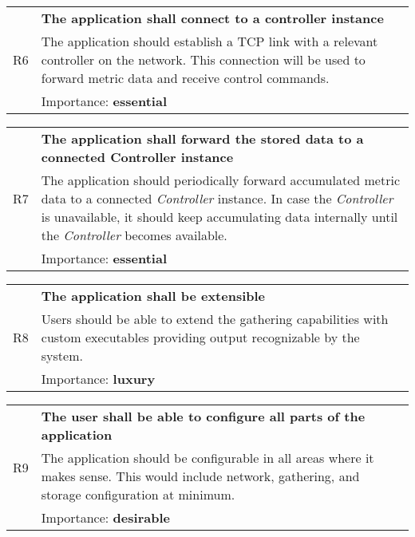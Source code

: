             \vspace{0.5cm}
            \noindent
            \begin{tabular}{ p{0.7cm}|p{14.5cm} }
                \multirow{3}{*}{R6 } & \textbf{The application shall connect to a controller instance}\\
                \cline{2-2}
                & The application should establish a TCP link with a relevant controller on the network. This connection will be used to forward metric data and receive control commands.\\
                \cline{2-2}
                & Importance: \textbf{essential}
            \end{tabular}

            \vspace{0.5cm}
            \noindent
            \begin{tabular}{ p{0.7cm}|p{14.5cm} }
                \multirow{3}{*}{R7 } & \textbf{The application shall forward the stored data to a connected Controller instance}\\
                \cline{2-2}
                & The application should periodically forward accumulated metric data to a connected \textit{Controller} instance. In case the \textit{Controller} is unavailable, it should keep accumulating data internally until the \textit{Controller} becomes available.\\
                \cline{2-2}
                & Importance: \textbf{essential}
            \end{tabular}

            \vspace{0.5cm}
            \noindent
            \begin{tabular}{ p{0.7cm}|p{14.5cm} }
                \multirow{3}{*}{R8 } & \textbf{The application shall be extensible}\\
                \cline{2-2}
                & Users should be able to extend the gathering capabilities with custom executables providing output recognizable by the system.\\
                \cline{2-2}
                & Importance: \textbf{luxury}
            \end{tabular}

            \vspace{0.5cm}
            \noindent
            \begin{tabular}{ p{0.7cm}|p{14.5cm} }
                \multirow{3}{*}{R9 } & \textbf{The user shall be able to configure all parts of the application}\\
                \cline{2-2}
                & The application should be configurable in all areas where it makes sense. This would include network, gathering, and storage configuration at minimum.\\
                \cline{2-2}
                & Importance: \textbf{desirable}
            \end{tabular}

